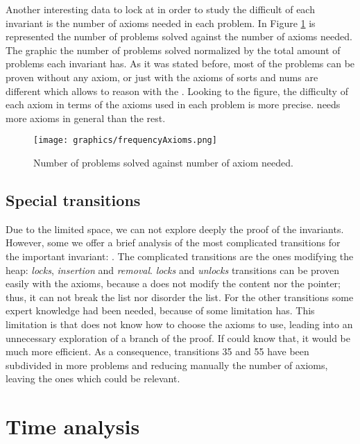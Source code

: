 Another interesting data to lock at in order to study the difficult of each invariant is the number of axioms needed in each problem. 
%
In Figure \ref{fig:frequencyAxioms} is represented the number of problems solved against the number of axioms needed.
%
The graphic the number of problems solved normalized by the total amount of problems each invariant has.
%
As it was stated before, most of the problems can be proven without any axiom, or just with the axioms of sorts and nums are different which allows to reason with the \pc.
%
Looking to the figure, the difficulty of each axiom in terms of the axioms used in each problem is more precise. 
%
\invOrder needs more axioms in general than the rest.


\begin{figure}[hbtp]
\centering
\texttt{[image: graphics/frequencyAxioms.png]}
\caption{Number of problems solved against number of axiom needed.}
\label{fig:frequencyAxioms}
\end{figure}

\subsection{Special transitions}

Due to the limited space, we can not explore deeply the proof of the invariants.
%
However, some we offer a brief analysis of the most complicated transitions for the important invariant: \invPreserve. The complicated transitions are the ones modifying the heap: \textit{locks}, \textit{insertion} and \textit{removal}. 
%
\textit{locks} and \textit{unlocks} transitions can be proven easily with the axioms, because a \fLock does not modify the content nor the pointer; thus, it can not break the list nor disorder the list.
%
For the other transitions some expert knowledge had been needed, because of some limitation \spass has.
%
This limitation is that \spass does not know how to choose the axioms to use, leading into an unnecessary exploration of a branch of the proof. 
%
\label{infty:time}
If \spass could know that, it would be much more efficient. 
%
As a consequence, transitions 35 and 55 have been subdivided in more \spass problems and reducing manually the number of axioms, leaving the ones which could be relevant.
%

\section{Time analysis}
\label{sec:timeanalysis}

